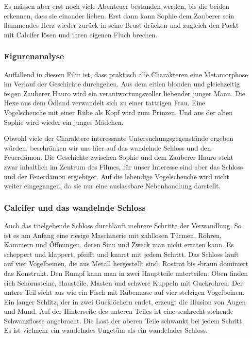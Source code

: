 Es müssen aber erst noch viele Abenteuer bestanden werden, bis die beiden erkennen, dass sie einander lieben. Erst dann kann Sophie dem Zauberer sein flammendes Herz wieder zurück in seine Brust drücken und zugleich den Packt mit Calcifer lösen und ihren eigenen Fluch brechen. 

\subsubsection{Figurenanalyse} 
Auffallend in diesem Film ist, dass praktisch alle Charakteren eine Metamorphose im Verlauf der Geschichte durchgehen. Aus dem eitlen blonden und gleich\-zeitig feigen Zauberer Hauro wird ein verantwortungsvoller liebender junger Mann. Die Hexe aus dem Ödland verwandelt sich zu einer tattrigen Frau. Eine Vogelscheuche mit einer Rübe als Kopf wird zum Prinzen. Und aus der alten Sophie wird wieder ein junges Mädchen.  

Obwohl viele der Charaktere interessante Untersuchungsgegenstände ergeben würden, beschränken wir uns hier auf das wandelnde Schloss und den Feuerdämon. Die Geschichte zwischen Sophie und dem Zauberer Hauro steht zwar inhaltlich im Zentrum des Filmes, für unser Interesse sind aber das Schloss und der Feuerdämon ergiebiger. Auf die lebendige Vogelscheuche wird nicht weiter eingegangen, da sie nur eine auslassbare Nebenhandlung darstellt. 

\subsubsection*{Calcifer und das wandelnde Schloss} 
Auch das titelgebende Schloss durchläuft mehrere Schritte der Verwandlung. So ist es am Anfang eine riesige Maschinerie mit zahllosen Türmen, Röhren, Kammern und Öffnungen, deren Sinn und Zweck man nicht erraten kann. Es scheppert und klappert, pfeifft und knarrt mit jedem Schritt. Das Schloss läuft auf vier Vogelbeinen, die aus Metall hergestellt sind. Rostrot bis -braun dominiert das Konstrukt. Den Rumpf kann man in zwei Hauptteile unterteilen: Oben finden sich Schornsteine, Hausteile, Masten und schwere Kuppeln mit Guckrohren. Der untere Teil sieht aus wie ein Fisch mit Rübennase auf vier stelzigen Vogelbeinen. Ein langer Schlitz, der in zwei Gucklöchern endet, erzeugt die Illusion von Augen und Mund. Auf der Hinterseite des unteren Teiles ist eine senkrecht stehende Schwanzflosse angebracht. Die Last der oberen Teile schwankt bei jedem Schritt. Es ist vielmehr ein wandelndes Ungetüm als ein wandelndes Schloss. 

